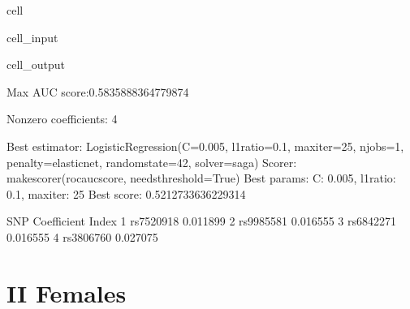 \documentclass[letterpaper,10pt,english]{jupyterBook}
\begin{document}
\begin{sphinxuseclass}{cell}
\begin{sphinxVerbatimInput}
\begin{sphinxuseclass}{cell_input}
\end{sphinxuseclass}\end{sphinxVerbatimInput}
\begin{sphinxVerbatimOutput}

\begin{sphinxuseclass}{cell_output}
\begin{sphinxVerbatim}[commandchars=\\\{\}]
Max AUC score:0.5835888364779874

Non\PYGZhy{}zero coefficients: 4

Best estimator: LogisticRegression(C=0.005, l1\PYGZus{}ratio=0.1, max\PYGZus{}iter=25, n\PYGZus{}jobs=\PYGZhy{}1,
                   penalty=\PYGZsq{}elasticnet\PYGZsq{}, random\PYGZus{}state=42, solver=\PYGZsq{}saga\PYGZsq{})
Scorer: make\PYGZus{}scorer(roc\PYGZus{}auc\PYGZus{}score, needs\PYGZus{}threshold=True)
Best params: \PYGZob{}\PYGZsq{}C\PYGZsq{}: 0.005, \PYGZsq{}l1\PYGZus{}ratio\PYGZsq{}: 0.1, \PYGZsq{}max\PYGZus{}iter\PYGZsq{}: 25\PYGZcb{}
Best score: 0.5212733636229314
\end{sphinxVerbatim}

\begin{sphinxVerbatim}[commandchars=\\\{\}]
             SNP Coefficient
Index                       
1      rs7520918   \PYGZhy{}0.011899
2      rs9985581    0.016555
3      rs6842271    0.016555
4      rs3806760    0.027075
\end{sphinxVerbatim}

\end{sphinxuseclass}\end{sphinxVerbatimOutput}

\end{sphinxuseclass}

\section{II Females}
\label{\detokenize{Cooper:ii-females}}
\end{document}
